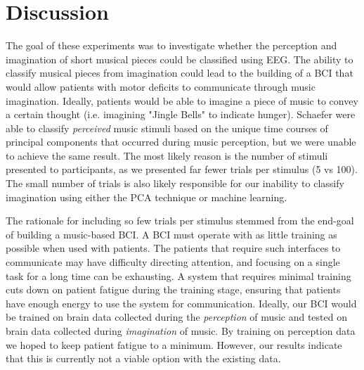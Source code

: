 \chapter{Discussion}
The goal of these experiments was to investigate whether the perception and imagination of short musical pieces could be classified using EEG.  
The ability to classify musical pieces from imagination could lead to the building of a \ac{BCI} that would allow patients with motor deficits to communicate through music imagination.
Ideally, patients would be able to imagine a piece of music to convey a certain thought (i.e. imagining "Jingle Bells" to indicate hunger).
Schaefer \etal \citeyear{schaefer_name_2011} were able to classify \emph{perceived} music stimuli based on the unique time courses of principal components that occurred during music perception, but we were unable to achieve the same result. 
The most likely reason is the number of stimuli presented to participants, as we presented far fewer trials per stimulus (5 vs 100). 
The small number of trials is also likely responsible for our inability to classify imagination using either the PCA technique or machine learning. 

The rationale for including so few trials per stimulus stemmed from the end-goal of building a music-based \ac{BCI}. 
A \ac{BCI} must operate with as little training as possible when used with patients.
The patients that require such interfaces to communicate may have difficulty directing attention, and focusing on a single task for a long time can be exhausting. 
A system that requires minimal training cuts down on patient fatigue during the training stage, ensuring that patients have enough energy to use the system for communication. 
Ideally, our \ac{BCI} would be trained on brain data collected during the \emph{perception} of music and tested on brain data collected during \emph{imagination} of music. 
By training on perception data we hoped to keep patient fatigue to a minimum. 
However, our results indicate that this is currently not a viable option with the existing data.  

